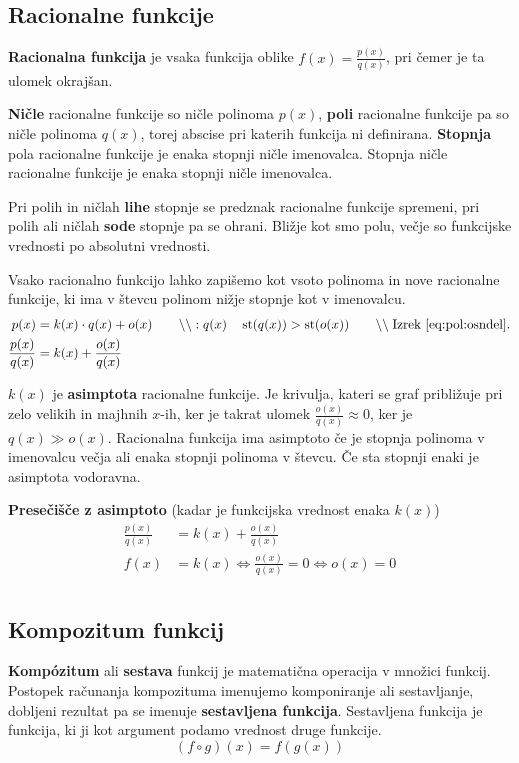 \documentclass[a4paper,oneside,12pt,fleqn]{article}
\newcommand\krat\cdot
\newcommand{\comment}[1]{\ensuremath{\qquad\backslash\backslash\;}\textnormal{#1}}
\newcommand{\st}{\ensuremath{\operatorname{st}}} %
\renewcommand\iff\Leftrightarrow
\numberwithin{equation}{section}
\begin{document}
\subsection{Racionalne funkcije}
\label{sec:fun:rac}
\textbf{Racionalna funkcija} je vsaka funkcija oblike $f(x) = \frac{p(x)}{q(x)}$, pri čemer je ta
ulomek okrajšan.

\textbf{Ničle} racionalne funkcije so ničle polinoma $p(x)$, \textbf{poli} racionalne funkcije pa so ničle
polinoma $q(x)$, torej abscise pri katerih funkcija ni definirana. \textbf{Stopnja} pola racionalne funkcije je enaka stopnji ničle
imenovalca. Stopnja ničle racionalne funkcije je enaka stopnji ničle imenovalca.

Pri polih in ničlah \textbf{lihe} stopnje se predznak racionalne funkcije spremeni, pri polih ali
ničlah \textbf{sode} stopnje pa se ohrani. Bližje kot smo polu, večje so funkcijske
vrednosti po absolutni vrednosti.

Vsako racionalno funkcijo lahko zapišemo kot vsoto polinoma in nove racionalne funkcije,
ki ima v števcu polinom nižje stopnje kot v imenovalcu.
\begin{align*}
  p(x) &= k(x) \krat q(x) + o(x) \comment{$:q(x)$}  \quad \st(q(x)) > \st(o(x))
  \comment{Izrek~\eqref{eq:pol:osndel}.} \\
    \frac{p(x)}{q(x)} &= k(x) + \frac{o(x)}{q(x)} 
\end{align*}

$k(x)$ je \textbf{asimptota} racionalne funkcije. Je krivulja, kateri se graf približuje pri zelo
velikih in majhnih $x$-ih, ker je takrat ulomek $\frac{o(x)}{q(x)} \approx 0$, ker je $q(x)
\gg o(x)$. Racionalna funkcija ima asimptoto če je stopnja polinoma v imenovalcu večja ali
enaka stopnji polinoma v števcu. Če sta stopnji enaki je asimptota vodoravna.

\textbf{Presečišče z asimptoto} (kadar je funkcijska vrednost enaka $k(x)$)
\begin{align*}
    \frac{p(x)}{q(x)} &= k(x) + \frac{o(x)}{q(x)} \\
    f(x) &= k(x) \iff \frac{o(x)}{q(x)} = 0 \iff o(x) = 0 \\
\end{align*}

\subsection{Kompozitum funkcij}
\textbf{Komp\'{o}zitum} ali \textbf{sestava} funkcij je matematična operacija v množici funkcij.
Postopek računanja kompozituma imenujemo komponiranje ali sestavljanje, dobljeni rezultat
pa se imenuje \textbf{sestavljena funkcija}. Sestavljena funkcija je funkcija, ki ji kot argument podamo vrednost druge
funkcije.
\[ (f \circ g)(x) = f(g(x)) \]
\end{document}
